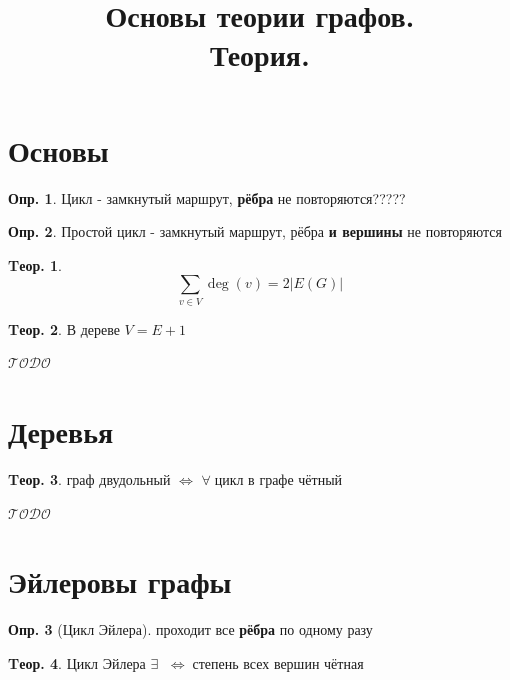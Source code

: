 \documentclass[a4paper,12pt]{article}
\title{Основы теории графов.\\Теория.}
\author{}
\date{}
\numberwithin{figure}{section}
\theoremstyle{definition}
\newtheorem{definition}{Опр.}[section]
\theoremstyle{definition}
\newtheorem{theorem}{Tеор.}[section]
\def\iiff{$\;\Longleftrightarrow\;$}
\def\iiany{$\forall\;$}
\def\iiTODO{\guillemotleft$\mathcal{TODO}$\guillemotright\textellipsis}
\begin{document}
\maketitle

\tableofcontents



\section{Основы}

\begin{definition}
	Цикл - замкнутый маршрут, \textbf{рёбра} не повторяются?????
\end{definition}

\begin{definition}
	Простой цикл - замкнутый маршрут, рёбра \textbf{и вершины} не повторяются
\end{definition}

\begin{theorem}
	\[ \sum_{v \in V} \deg(v) = 2 |E(G)|  \]
\end{theorem}

\begin{theorem}
	В дереве $V = E+1$
\end{theorem}

\iiTODO



\section{Деревья}

\begin{theorem}
	граф двудольный $\Longleftrightarrow$ \iiany цикл в графе чётный
\end{theorem}

\iiTODO



\section{Эйлеровы графы}

\begin{definition}[Цикл Эйлера] проходит все \textbf{рёбра} по одному разу \end{definition}

\begin{theorem}
	Цикл Эйлера $\exists$ \iiff степень всех вершин чётная
\end{theorem}
\end{document}
